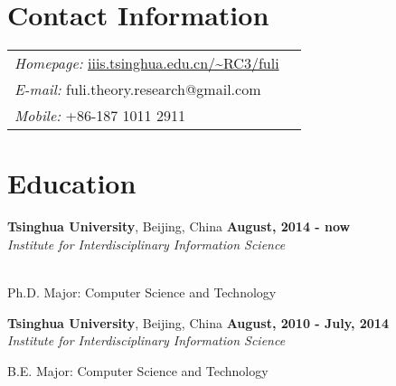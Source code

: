 \documentclass[margin,line]{res}
\newenvironment{list1}{
  \begin{list}{\ding{113}}{%
      \setlength{\itemsep}{0in}
      \setlength{\parsep}{0in} \setlength{\parskip}{0in}
      \setlength{\topsep}{0in} \setlength{\partopsep}{0in}
      \setlength{\leftmargin}{0.17in}}}{\end{list}}
\begin{document}



\begin{resume}
\section{\sc Contact Information}
\vspace{.05in}
\begin{tabular}{@{}p{4in}p{4in}}
{\it Homepage:}  \url{iiis.tsinghua.edu.cn/~RC3/fuli} \\
{\it E-mail:}  fuli.theory.research@gmail.com \\
{\it Mobile:}  +86-187 1011 2911 \\

\end{tabular}



\section{\sc Education}
{\bf Tsinghua University}, Beijing, China \hfill {\bf August, 2014 - now}\\
{\em Institute for Interdisciplinary Information Science}\\
\\
\vspace*{-.1in}
\begin{list1}
	\item[] Ph.D. Major: Computer Science and Technology 
	
\end{list1}



{\bf Tsinghua University}, Beijing, China \hfill {\bf August, 2010 - July, 2014}\\
{\em Institute for Interdisciplinary Information Science}\\
\vspace*{-.1in}
\begin{list1}
\item[] B.E.  Major: Computer Science and Technology 
\end{list1}


\end{resume}
\end{document}
